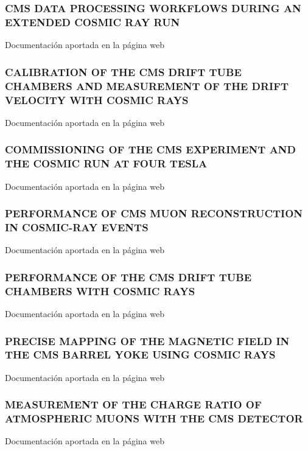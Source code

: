 \documentclass[a4paper, 11pt, twoside, openright]{report}
\begin{document}
\subsubsection{CMS DATA PROCESSING WORKFLOWS DURING AN EXTENDED COSMIC RAY RUN}
Documentación aportada en la página web
%
\subsubsection{CALIBRATION OF THE CMS DRIFT TUBE CHAMBERS AND MEASUREMENT OF THE DRIFT VELOCITY WITH COSMIC RAYS}
Documentación aportada en la página web
%
\subsubsection{COMMISSIONING OF THE CMS EXPERIMENT AND THE COSMIC RUN AT FOUR TESLA}
Documentación aportada en la página web
%
\subsubsection{PERFORMANCE OF CMS MUON RECONSTRUCTION IN COSMIC-RAY EVENTS}
Documentación aportada en la página web
%
\subsubsection{PERFORMANCE OF THE CMS DRIFT TUBE CHAMBERS WITH COSMIC RAYS}
Documentación aportada en la página web
%
\subsubsection{PRECISE MAPPING OF THE MAGNETIC FIELD IN THE CMS BARREL YOKE USING COSMIC RAYS}
Documentación aportada en la página web
%
\subsubsection{MEASUREMENT OF THE CHARGE RATIO OF ATMOSPHERIC MUONS WITH THE CMS DETECTOR}
Documentación aportada en la página web
%
\end{document}

